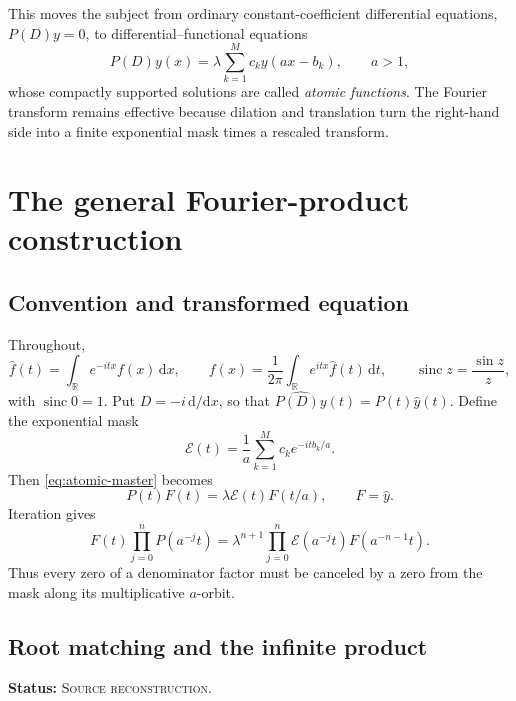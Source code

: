 \documentclass[11pt,oneside]{article}
\theoremstyle{definition}
\theoremstyle{remark}
\newcommand{\sinc}{\operatorname{sinc}}
\newcommand{\R}{\mathbb{R}}
\newcommand{\dd}{\,\mathrm{d}}
\newcommand{\SourceStatus}{\textcolor{SourceBlue}{\textsc{Source reconstruction}}}
\newcommand{\status}[1]{\par\smallskip\noindent\textbf{Status:} #1.\par\smallskip}
\begin{document}
This moves the subject from ordinary constant-coefficient differential equations,
\(P(D)y=0\), to differential--functional equations
\begin{equation}
  P(D)y(x)=\lambda\sum_{k=1}^{M}c_k y(ax-b_k),
  \qquad a>1,
  \label{eq:atomic-master}
\end{equation}
whose compactly supported solutions are called \emph{atomic functions}.  The Fourier transform remains effective because dilation and translation turn the right-hand side into a finite exponential mask times a rescaled transform.

\section{The general Fourier-product construction}
\label{sec:atomic-general}

\subsection{Convention and transformed equation}

Throughout,
\begin{equation}
  \widehat f(t)=\int_{\R}e^{-itx}f(x)\dd x,
  \qquad
  f(x)=\frac1{2\pi}\int_{\R}e^{itx}\widehat f(t)\dd t,
  \qquad \sinc z=\frac{\sin z}{z},
  \label{eq:fourier-convention}
\end{equation}
with \(\sinc 0=1\).  Put \(D=-i\,\mathrm d/\mathrm dx\), so that
\(\widehat{P(D)y}(t)=P(t)\widehat y(t)\).  Define the exponential mask
\begin{equation}
  \mathcal E(t)=\frac1a\sum_{k=1}^{M}c_k e^{-itb_k/a}.
  \label{eq:mask-E}
\end{equation}
Then \eqref{eq:atomic-master} becomes
\begin{equation}
  P(t)F(t)=\lambda\mathcal E(t)F(t/a),
  \qquad F=\widehat y.
  \label{eq:fourier-refinement}
\end{equation}
Iteration gives
\begin{equation}
  F(t)\prod_{j=0}^{n}P(a^{-j}t)
   =\lambda^{n+1}\prod_{j=0}^{n}\mathcal E(a^{-j}t)F(a^{-n-1}t).
  \label{eq:finite-iteration}
\end{equation}
Thus every zero of a denominator factor must be canceled by a zero from the mask along its multiplicative \(a\)-orbit.

\subsection{Root matching and the infinite product}
\status{\SourceStatus}
\end{document}
